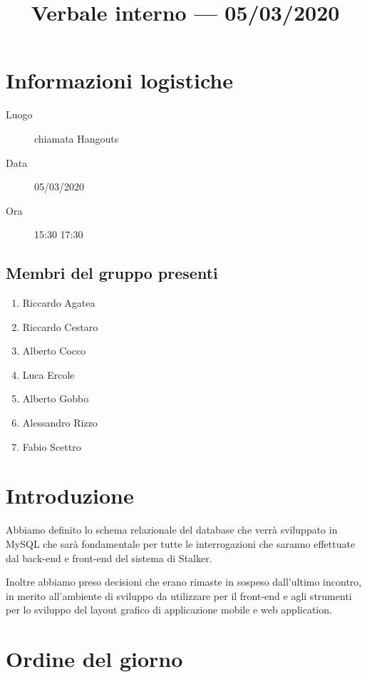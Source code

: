\documentclass{article}
\title{Verbale interno --- 05/03/2020}
\begin{document}


\section{Informazioni logistiche}%
\label{sec:informazioni_logistiche}

\begin{description}
  \item [Luogo] chiamata Hangouts
  \item [Data] 05/03/2020
  \item [Ora] 15:30  17:30
\end{description}

\subsection{Membri del gruppo presenti}%
\label{sub:membri_del_gruppo_presenti}

\begin{enumerate}
  \item Riccardo Agatea
  \item Riccardo Cestaro
  \item Alberto Cocco
  \item Luca Ercole
  \item Alberto Gobbo
  \item Alessandro Rizzo
  \item Fabio Scettro
\end{enumerate}

\section{Introduzione}%
\label{sec:introduzione}

Abbiamo definito lo schema relazionale del database che verrà sviluppato in MySQL che sarà fondamentale per tutte le interrogazioni che saranno effettuate dal back-end e front-end del sistema di Stalker.

Inoltre abbiamo preso decisioni che erano rimaste in sospeso dall'ultimo incontro, in merito all'ambiente di sviluppo da utilizzare per il front-end e agli strumenti per lo sviluppo del layout grafico di applicazione mobile e web application.

\section{Ordine del giorno}%
\label{sec:ordine_del_giorno}
\end{document}
